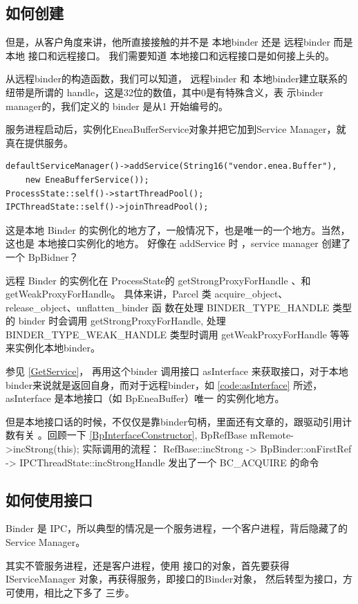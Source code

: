 \documentclass[a4paper,11pt]{article}
\begin{document}
\subsection{如何创建}
但是，从客户角度来讲，他所直接接触的并不是 本地binder 还是 远程binder
而是本地 接口和远程接口。 我们需要知道 本地接口和远程接口是如何接上头的。

从远程binder的构造函数，我们可以知道， 远程binder 和
本地binder建立联系的纽带是所谓的 handle，这是32位的数值，其中0是有特殊含义，表
示binder manager的，我们定义的 binder 是从1 开始编号的。

服务进程启动后，实例化EneaBufferService对象并把它加到Service Manager，就真在提供服务。
\begin{lstlisting}[label={addservice}]
defaultServiceManager()->addService(String16("vendor.enea.Buffer"),
    new EneaBufferService());
ProcessState::self()->startThreadPool();
IPCThreadState::self()->joinThreadPool();
\end{lstlisting}
这是本地 Binder 的实例化的地方了，一般情况下，也是唯一的一个地方。当然，这也是
本地接口实例化的地方。
好像在 addService 时 ，service manager 创建了一个 BpBidner？

远程 Binder 的实例化在 ProcessState的 getStrongProxyForHandle
\label{code:getStrongProxyForHandle}、和 getWeakProxyForHandle。
具体来讲，Parcel 类 acquire_object、release_object、unflatten_binder 函
数在处理 BINDER_TYPE_HANDLE 类型的 binder 时会调用
getStrongProxyForHandle, 处理 BINDER_TYPE_WEAK_HANDLE 类型时调用
getWeakProxyForHandle 等等来实例化本地binder。

参见 \autoref{GetService}， 再用这个binder 调用接口 asInterface
来获取接口，对于本地binder来说就是返回自身，而对于远程binder，如
\autoref{code:asInterface} 所述，asInterface 是本地接口（如 BpEneaBuffer）唯一
的实例化地方。

但是本地接口话的时候，不仅仅是靠binder句柄，里面还有文章的，跟驱动引用计数有关
。回顾一下 \autoref{BpInterfaceConstructor},
BpRefBase   mRemote->incStrong(this); 实际调用的流程：
RefBase::incStrong -> BpBinder::onFirstRef -> IPCThreadState::incStrongHandle
发出了一个 BC_ACQUIRE 的命令

\subsection{如何使用接口}
Binder 是 IPC，所以典型的情况是一个服务进程，一个客户进程，背后隐藏了的Service Manager。

其实不管服务进程，还是客户进程，使用 接口的对象，首先要获得IServiceManager
对象，再获得服务，即接口的Binder对象， 然后转型为接口，方可使用，相比之下多了
三步。
\end{document}
